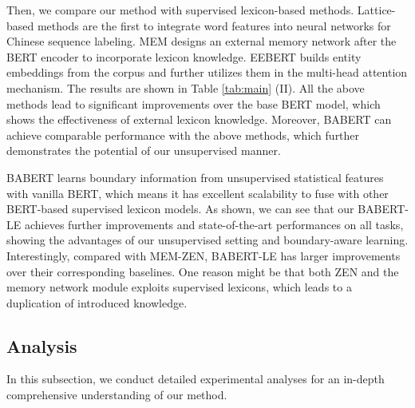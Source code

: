 \documentclass[11pt]{article}
\begin{document}
\begin{CJK}{UTF8}{gbsn}
Then, we compare our method with supervised lexicon-based methods.
Lattice-based methods \cite{zhang-yang-2018-chinese, yang-etal-2019-subword} are the first to integrate word features into neural networks for Chinese sequence labeling.
MEM \cite{tian-etal-2020-joint-chinese, tian-etal-2020-improving-chinese}
designs an external memory network after the BERT encoder to incorporate lexicon knowledge.
EEBERT \cite{jia-etal-2020-entity} builds entity embeddings from the corpus and further utilizes them in the multi-head attention mechanism.
The results are shown in Table \ref{tab:main} (II).
All the above methods lead to significant improvements over the base BERT model,
which shows the effectiveness of external lexicon knowledge.
Moreover, BABERT can achieve comparable performance with the above methods,
which further demonstrates the potential of our unsupervised manner. 

BABERT learns boundary information from unsupervised statistical features with vanilla BERT,
which means it has excellent scalability to fuse with other BERT-based supervised lexicon models.
As shown, we can see that our BABERT-LE achieves further improvements and state-of-the-art performances on all tasks,
showing the advantages of our unsupervised setting and boundary-aware learning.
Interestingly, compared with MEM-ZEN, BABERT-LE has larger improvements over their corresponding baselines.
One reason might be that both ZEN and the memory network module exploits supervised lexicons,
which leads to a duplication of introduced knowledge.







\subsection{Analysis}
\label{sec:analysis}
In this subsection, we conduct detailed experimental analyses for an in-depth comprehensive understanding of our method.




\end{CJK}
\end{document}

